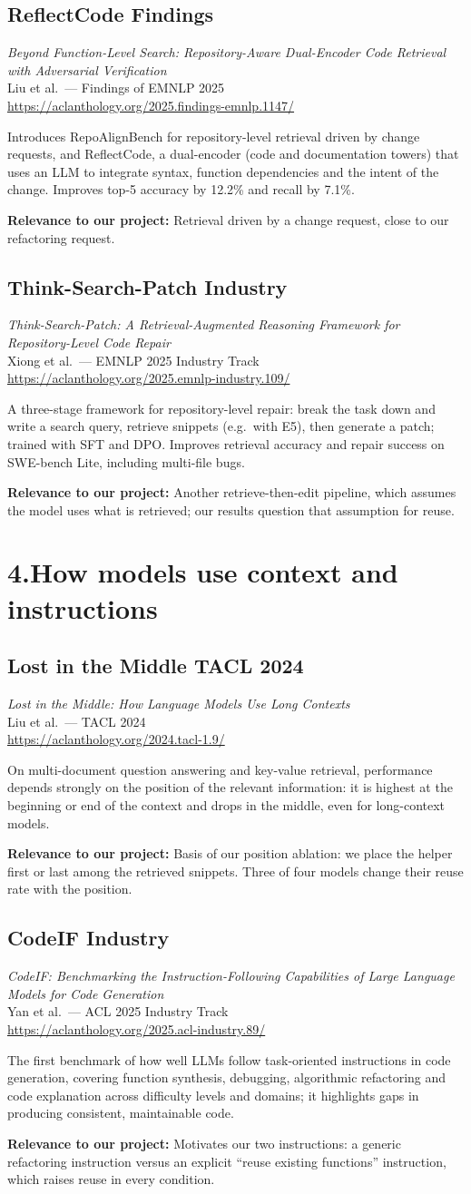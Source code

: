 \documentclass[11pt,a4paper]{article}
\newcommand{\tagbox}[2]{\colorbox{#1!15}{\textcolor{#1!80!black}{\footnotesize\textbf{#2}}}}
\newcommand{\paper}[6]{%
  \subsection*{#1 \hfill #4}
  \textit{#2}\\
  {\small #3}\\
  {\small\url{#5}}\par
  #6
  \vspace{0.4em}}
\newcommand{\why}[1]{\par\textbf{Relevance to our project:} #1}
\begin{document}
\paper{ReflectCode}
{Beyond Function-Level Search: Repository-Aware Dual-Encoder Code Retrieval with Adversarial Verification}
{Liu et al.\ --- Findings of EMNLP 2025}
{\tagbox{findings}{Findings}}
{https://aclanthology.org/2025.findings-emnlp.1147/}
{Introduces RepoAlignBench for repository-level retrieval driven by change requests, and ReflectCode,
a dual-encoder (code and documentation towers) that uses an LLM to integrate syntax, function
dependencies and the intent of the change. Improves top-5 accuracy by 12.2\% and recall by 7.1\%.
\why{Retrieval driven by a change request, close to our refactoring request.}}

\paper{Think-Search-Patch}
{Think-Search-Patch: A Retrieval-Augmented Reasoning Framework for Repository-Level Code Repair}
{Xiong et al.\ --- EMNLP 2025 Industry Track}
{\tagbox{findings}{Industry}}
{https://aclanthology.org/2025.emnlp-industry.109/}
{A three-stage framework for repository-level repair: break the task down and write a search query,
retrieve snippets (e.g.\ with E5), then generate a patch; trained with SFT and DPO. Improves retrieval
accuracy and repair success on SWE-bench Lite, including multi-file bugs.
\why{Another retrieve-then-edit pipeline, which assumes the model uses what is retrieved; our results
question that assumption for reuse.}}

\section{4.\quad How models use context and instructions}

\paper{Lost in the Middle}
{Lost in the Middle: How Language Models Use Long Contexts}
{Liu et al.\ --- TACL 2024}
{\tagbox{main}{TACL 2024}}
{https://aclanthology.org/2024.tacl-1.9/}
{On multi-document question answering and key-value retrieval, performance depends strongly on the
position of the relevant information: it is highest at the beginning or end of the context and drops
in the middle, even for long-context models.
\why{Basis of our position ablation: we place the helper first or last among the retrieved snippets.
Three of four models change their reuse rate with the position.}}

\paper{CodeIF}
{CodeIF: Benchmarking the Instruction-Following Capabilities of Large Language Models for Code Generation}
{Yan et al.\ --- ACL 2025 Industry Track}
{\tagbox{findings}{Industry}}
{https://aclanthology.org/2025.acl-industry.89/}
{The first benchmark of how well LLMs follow task-oriented instructions in code generation, covering
function synthesis, debugging, algorithmic refactoring and code explanation across difficulty levels and
domains; it highlights gaps in producing consistent, maintainable code.
\why{Motivates our two instructions: a generic refactoring instruction versus an explicit ``reuse
existing functions'' instruction, which raises reuse in every condition.}}
\end{document}
